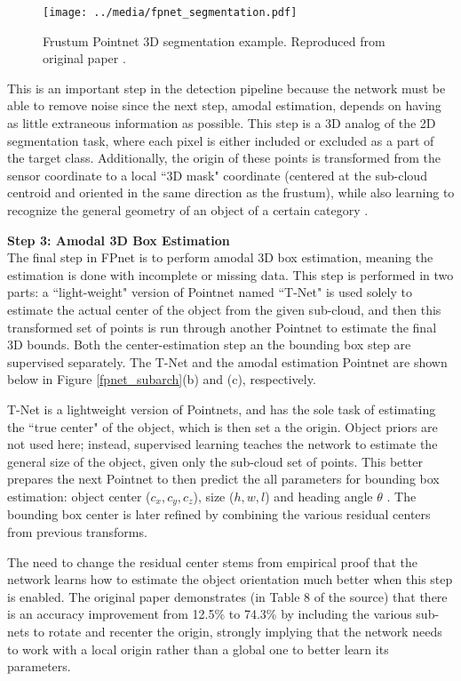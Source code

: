 \begin{figure}[H]
    \centering
    \texttt{[image: ../media/fpnet\_segmentation.pdf]}
    \caption{Frustum Pointnet 3D segmentation example. Reproduced from original paper \cite{qi_frustum_2017}.}
    \label{fpnet_segmentation}
\end{figure}

This is an important step in the detection pipeline because the network must be able to remove noise since the next step, amodal estimation, depends on having as little extraneous information as possible. This step is a 3D analog of the 2D segmentation task, where each pixel is either included or excluded as a part of the target class. Additionally, the origin of these points is transformed from the sensor coordinate to a local ``3D mask" coordinate (centered at the sub-cloud centroid and oriented in the same direction as the frustum), while also learning to recognize the general geometry of an object of a certain category \cite{qi_frustum_2017}.

\textbf{{\large Step 3: Amodal 3D Box Estimation}} \\
The final step in FPnet is to perform amodal 3D box estimation, meaning the estimation is done with incomplete or missing data. This step is performed in two parts: a ``light-weight" version of Pointnet named ``T-Net" is used solely to estimate the actual center of the object from the given sub-cloud, and then this transformed set of points is run through another Pointnet to estimate the final 3D bounds. Both the center-estimation step an the bounding box step are supervised separately. The T-Net and the amodal estimation Pointnet are shown below in Figure \ref{fpnet_subarch}(b) and (c), respectively. 

T-Net is a lightweight version of Pointnets, and has the sole task of estimating the ``true center" \cite{qi_frustum_2017} of the object, which is then set a the origin. Object priors are not used here; instead, supervised learning teaches the network to estimate the general size of the object, given only the sub-cloud set of points. This better prepares the next Pointnet to then predict the all parameters for bounding box estimation: object center ($c_x,c_y,c_z$), size ($h,w,l$) and heading angle $\theta$ \cite{qi_frustum_2017}. The bounding box center is later refined by combining the various residual centers from previous transforms. 

The need to change the residual center stems from empirical proof that the network learns how to estimate the object orientation much better when this step is enabled. The original paper demonstrates (in Table 8 of the source) that there is an accuracy improvement from 12.5\% to 74.3\% by including the various sub-nets to rotate and recenter the origin, strongly implying that the network needs to work with a local origin rather than a global one to better learn its parameters. 

